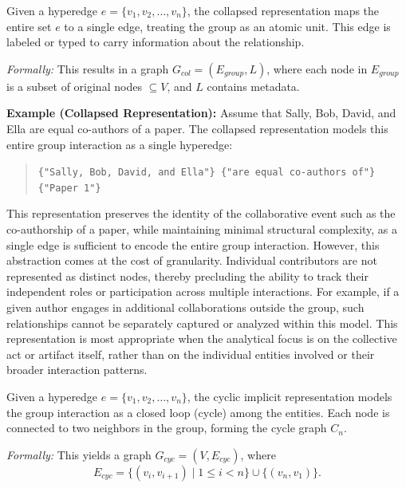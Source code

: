 \documentclass{article}
\begin{document}
\begin{mdframed}[linewidth=1pt, linecolor=black!60, backgroundcolor=gray!5]
\begin{defn}
Given a hyperedge $e = \{v_1, v_2, \ldots, v_n\}$, the collapsed representation maps the entire set $e$ to a single edge, treating the group as an atomic unit. This edge is labeled or typed to carry information about the relationship.

\medskip

\noindent\textit{Formally:} This results in a graph $G_{col} = (E_{group}, L)$, where each node in $E_{group}$ is a subset of original nodes $\subseteq V$, and $L$ contains metadata.
\end{defn}
\end{mdframed}

\vspace{4mm}

\noindent\textbf{Example (Collapsed Representation):} 
Assume that Sally, Bob, David, and Ella are equal co-authors of a paper. The collapsed representation models this entire group interaction as a single hyperedge:

\begin{quote}
\texttt{\{"Sally, Bob, David, and Ella"\} \{"are equal co-authors of"\} \{"Paper 1"\}}
\end{quote}

This representation preserves the identity of the collaborative event such as the co-authorship of a paper, while maintaining minimal structural complexity, as a single edge is sufficient to encode the entire group interaction. However, this abstraction comes at the cost of granularity. Individual contributors are not represented as distinct nodes, thereby precluding the ability to track their independent roles or participation across multiple interactions. For example, if a given author engages in additional collaborations outside the group, such relationships cannot be separately captured or analyzed within this model. This representation is most appropriate when the analytical focus is on the collective act or artifact itself, rather than on the individual entities involved or their broader interaction patterns.

\begin{mdframed}[linewidth=1pt, linecolor=black!60, backgroundcolor=gray!5]
\begin{defn}
Given a hyperedge $e = \{v_1, v_2, \ldots, v_n\}$, the cyclic implicit representation models the group interaction as a closed loop (cycle) among the entities. Each node is connected to two neighbors in the group, forming the cycle graph $C_n$. 

\medskip

\noindent\textit{Formally:} This yields a graph $G_{cyc} = (V, E_{cyc})$, where
\[
E_{cyc} = \{(v_i, v_{i+1}) \mid 1 \leq i < n\} \cup \{(v_n, v_1)\}.
\]
\end{defn}
\end{mdframed}
\end{document}
